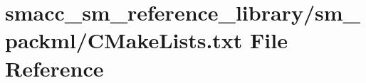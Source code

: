\hypertarget{sm__reference__library_2sm__packml_2CMakeLists_8txt}{}\section{smacc\+\_\+sm\+\_\+reference\+\_\+library/sm\+\_\+packml/\+C\+Make\+Lists.txt File Reference}
\label{sm__reference__library_2sm__packml_2CMakeLists_8txt}

